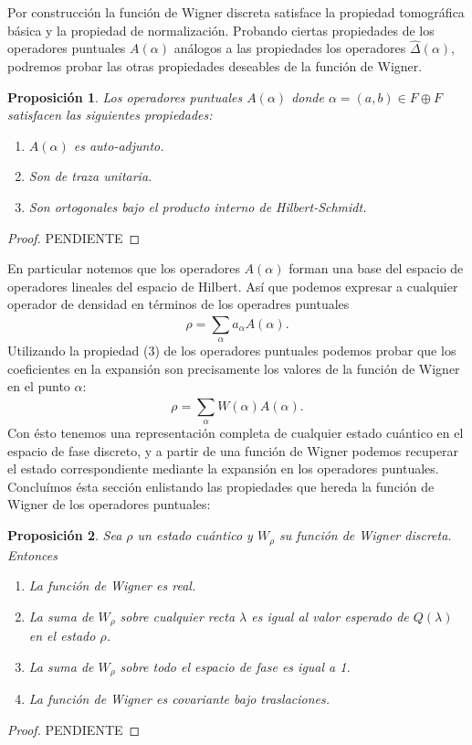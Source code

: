 \documentclass[a4paper]{report}
\newtheorem{proposition}{Proposición}
\begin{document}
  Por construcción la función de Wigner discreta
  satisface la propiedad tomográfica básica y la propiedad
  de normalización. Probando ciertas propiedades de los
  operadores puntuales $A(\alpha)$ análogos a las
  propiedades los operadores $\hat \Delta(\alpha)$, podremos
  probar las otras propiedades deseables de la función de
  Wigner.
  \begin{proposition}
    Los operadores puntuales $A(\alpha)$ donde $\alpha =
    (a,b) \in F \oplus F$ satisfacen las siguientes
    propiedades:
    \begin{enumerate}
      \item $A(\alpha)$ es auto-adjunto.
      \item Son de traza unitaria.
      \item Son ortogonales bajo el producto interno de
        Hilbert-Schmidt.
    \end{enumerate}
  \end{proposition}
  \begin{proof}
    PENDIENTE
  \end{proof}

  En particular notemos que los operadores $A(\alpha)$ 
  forman una base del espacio de operadores lineales del
  espacio de Hilbert. Así que podemos expresar a cualquier
  operador de densidad en términos de los operadres
  puntuales
  \[
    \rho = \sum_{\alpha}^{} a_\alpha A(\alpha).
  \] 
  Utilizando la propiedad (3) de los operadores puntuales
  podemos probar que los coeficientes en la expansión son
  precisamente los valores de la función de Wigner en el
  punto $\alpha$:
  \[
    \rho = \sum_{\alpha}^{} W(\alpha) A(\alpha).
  \] 
  Con ésto tenemos una representación completa de cualquier
  estado cuántico en el espacio de fase discreto, y a partir
  de una función de Wigner podemos recuperar el estado
  correspondiente mediante la expansión en los operadores
  puntuales. Concluímos ésta sección enlistando las
  propiedades que hereda la función de Wigner de los
  operadores puntuales:
  \begin{proposition}
    Sea $\rho$ un estado cuántico y $W_\rho$ su función de
    Wigner discreta. Entonces
    \begin{enumerate}
      \item La función de Wigner es real.
      \item La suma de $W_\rho$ sobre cualquier recta
        $\lambda$ es igual al valor esperado de $Q(\lambda)$ 
        en el estado $\rho$.
      \item La suma de $W_\rho$ sobre todo el espacio de fase
        es igual a 1.
      \item La función de Wigner es covariante bajo
        traslaciones.
    \end{enumerate}
  \end{proposition}
  \begin{proof}
    PENDIENTE
  \end{proof}
\end{document}
